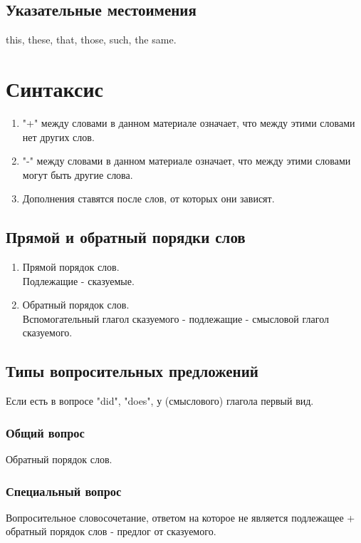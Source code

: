 \documentclass[oneside]{book}
\begin{document}
	\section{Указательные местоимения}
	this, these, that, those, such, the same.

	\chapter{Синтаксис}
	\begin{enumerate}
		\item "+" между словами в данном материале означает, что между этими словами нет
		других слов.

		\item "{}-{}"{} между словами в данном материале означает, что между этими словами могут быть
		другие слова.

		\item Дополнения ставятся после слов, от которых они зависят.
	\end{enumerate}

	\section{Прямой и обратный порядки слов}
	\begin{enumerate}
		\item Прямой порядок слов.
		\\
		Подлежащие - сказуемые.

		\item Обратный порядок слов.
		\\
		Вспомогательный глагол сказуемого - подлежащие - смысловой глагол сказуемого.
	\end{enumerate}

	\section{Типы вопросительных предложений}
	Если есть в вопросе "did"{}, "does"{}, у (смыслового) глагола первый вид. \\

	\subsection{Общий вопрос}
	Обратный порядок слов.

	\subsection{Специальный вопрос}
	Вопросительное словосочетание, ответом на которое не является подлежащее
	+ обратный порядок слов - предлог от сказуемого.
\end{document}
